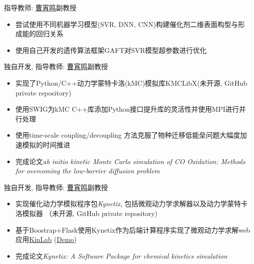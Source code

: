\documentclass{resume}
\begin{document}
 {指导教师: \faLink \href{http://chem.ecust.edu.cn/2014/1211/c6655a50467/page.htm}{曹宵鸣}副教授}
\begin{onehalfspacing}
\begin{itemize}
    \item 尝试使用不同机器学习模型(SVR, DNN, CNN)构建催化剂二维表面构型与形成能的回归关系
    \item 使用自己开发的遗传算法框架GAFT对SVR模型超参数进行优化
\end{itemize}
\end{onehalfspacing}

 {独自开发, 指导教师: \faLink \href{http://chem.ecust.edu.cn/2014/1211/c6655a50467/page.htm}{曹宵鸣}副教授}
\begin{onehalfspacing}
\begin{itemize}
    \item 实现了Python/C++动力学蒙特卡洛(kMC)模拟库KMCLibX(未开源, GitHub private repository)
    \item 使用SWIG为kMC C++库添加Python接口提升库的灵活性并使用MPI进行并行处理
    \item 使用time-scale coupling/decoupling 方法克服了物种迁移低能垒问题大幅度加速模拟的时间推进
    \item 完成论文\emph{ab initio kinetic Monte Carlo simulation of CO Oxidation: Methods for overcoming the low-barrier diffusion problem}
\end{itemize}
\end{onehalfspacing}

 {独自开发, 指导教师: \faLink \href{http://chem.ecust.edu.cn/2014/1211/c6655a50467/page.htm}{曹宵鸣}副教授}
\begin{onehalfspacing}
\begin{itemize}
    \item 实现催化动力学模拟程序包\emph{Kynetix}, 包括微观动力学求解器以及动力学蒙特卡洛模拟器 （未开源, GitHub private repository)
    \item 基于Boostrap+Flask使用Kynetix作为后端计算程序实现了微观动力学求解web应用\faLink \href{https://github.com/PytLab/KinLab}{KinLab} (\faLink \href{http://123.206.225.154:5000/}{Demo})
    \item 完成论文\emph{Kynetix: A Software Package for chemical kinetics simulation}
\end{itemize}
\end{onehalfspacing}
\end{document}

